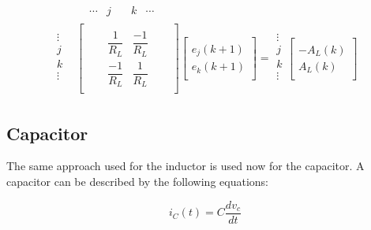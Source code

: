 \begin{align}
\begin{split}
&
\begin{matrix}
& \cdots & j & \quad k & \cdots
\end{matrix}\\[-6pt]
\begin{matrix}
\vdots\\[6pt]
j\\[6pt]
k\\[6pt]
\vdots\\
\end{matrix}
&
\begin{bmatrix}
	\quad & \quad &  \\[6pt]
	\quad & \dfrac{1}{R_L} & \dfrac{-1}{R_L} & \quad  \\[6pt]
	\quad & \dfrac{-1}{R_L} & \dfrac{1}{R_L} & \quad \\[6pt]
	\quad &  & 
\end{bmatrix}
\begin{bmatrix}
	\quad \\[6pt]
	e_j(k+1)\\[6pt]
	e_k(k+1)\\[6pt]
	\quad
\end{bmatrix}
=
\begin{matrix}
\vdots\\[6pt]
j\\[6pt]
k\\[6pt]
\vdots\\
\end{matrix}
\begin{bmatrix}
	\quad \\[6pt]
	-A_L(k)\\[6pt]
	A_L(k)\\[6pt]
	\quad
\end{bmatrix}
\end{split}
\end{align}

\subsection{Capacitor} \label{ResistiveCompanionCapacitor}

The same approach used for the inductor is used now for the capacitor.
A capacitor can be described by the following equations:

\begin{equation}
	i_C(t)= C \frac{d v_c}{dt}
\end{equation}

